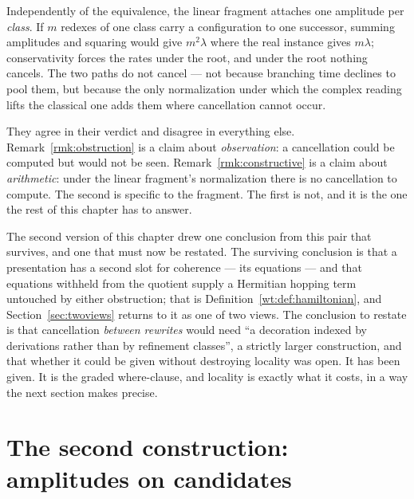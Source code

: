 \begin{remark}
\label{rmk:constructive}
Independently of the equivalence, the linear fragment attaches one amplitude
per \emph{class}.  If $m$ redexes of one class carry a configuration to one
successor, summing amplitudes and squaring would give $m^2\lambda$ where the
real instance gives $m\lambda$; conservativity forces the rates under the
root, and under the root nothing cancels.  The two paths do not cancel ---
not because branching time declines to pool them, but because the only
normalization under which the complex reading lifts the classical one adds
them where cancellation cannot occur.
\end{remark}

\begin{remark}
\label{rmk:two-obstructions}
They agree in their verdict and disagree in everything else.
Remark~\ref{rmk:obstruction} is a claim about \emph{observation}: a
cancellation could be computed but would not be seen.
Remark~\ref{rmk:constructive} is a claim about \emph{arithmetic}: under the
linear fragment's normalization there is no cancellation to compute.  The
second is specific to the fragment.  The first is not, and it is the one the
rest of this chapter has to answer.
\end{remark}

The second version of this chapter drew one conclusion from this pair that
survives, and one that must now be restated.  The surviving conclusion is
that a presentation has a second slot for coherence --- its equations ---
and that equations withheld from the quotient supply a Hermitian hopping
term untouched by either obstruction; that is Definition~\ref{wt:def:hamiltonian},
and Section~\ref{sec:twoviews} returns to it as one of two views.  The
conclusion to restate is that cancellation \emph{between rewrites} would need
``a decoration indexed by derivations rather than by refinement classes'', a
strictly larger construction, and that whether it could be given without
destroying locality was open.  It has been given.  It is the graded
where-clause, and locality is exactly what it costs, in a way the next
section makes precise.

\section{The second construction: amplitudes on candidates}
\label{sec:candidates}

